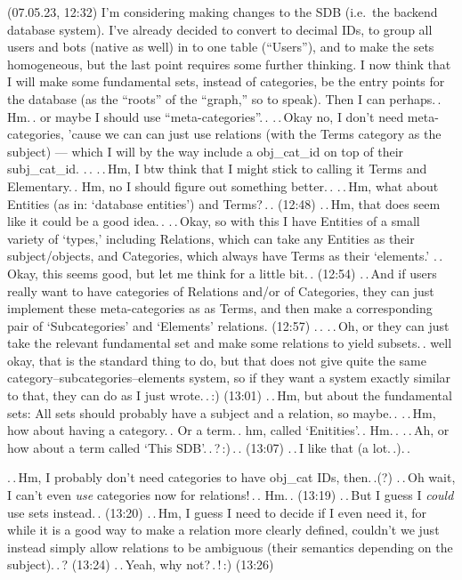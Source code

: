\documentclass{report}
\begin{document}
(07.05.23, 12:32) I'm considering making changes to the SDB (i.e.\ the backend database system). I've already decided to convert to decimal IDs, to group all users and bots (native as well) in to one table (``Users''), and to make the sets homogeneous, but the last point requires some further thinking. I now think that I will make some fundamental sets, instead of categories, be the entry points for the database (as the ``roots'' of the ``graph,'' so to speak). Then I can perhaps.\,. Hm.\,. or maybe I should use ``meta-categories''.\,. %
.\,.\,Okay no, I don't need meta-categories, 'cause we can can just use relations (with the Terms category as the subject) --- which I will by the way include a obj\_cat\_id on top of their subj\_cat\_id. .\,. %
.\,.\,Hm, I btw think that I might stick to calling it Terms and Elementary.\,. Hm, no I should figure out something better.\,. .\,.\,Hm, what about Entities (as in: `database entities') and Terms?\,.\,. (12:48) .\,.\,Hm, that does seem like it could be a good idea.\,. 
.\,.\,Okay, so with this I have Entities of a small variety of `types,' including Relations, which can take any Entities as their subject/objects, and Categories, which always have Terms as their `elements.' .\,.\,Okay, this seems good, but let me think for a little bit.\,. (12:54) .\,.\,And if users really want to have categories of Relations and/or of Categories, they can just implement these meta-categories as as Terms, and then make a corresponding pair of `Subcategories' and `Elements' relations. (12:57) .\,. .\,.\,Oh, or they can just take the relevant fundamental set and make some relations to yield subsets.\,. well okay, that is the standard thing to do, but that does not give quite the same category--subcategories--elements system, so if they want a system exactly similar to that, they can do as I just wrote.\,.\,:) (13:01) .\,.\,Hm, but about the fundamental sets: All sets should probably have a subject and a relation, so maybe.\,. .\,.\,Hm, how about having a category.\,. Or a term.\,. hm, called `Enitities'.\,. Hm.\,. .\,.\,Ah, or how about a term called `This SDB'.\,.\,?\,:)\,.\,. (13:07) .\,.\,I like that (a lot.\,.).\,.

.\,.\,Hm, I probably don't need categories to have obj\_cat IDs, then.\,.(?) .\,.\,Oh wait, I can't even \emph{use} categories now for relations!\,.\,. Hm.\,. (13:19) .\,.\,But I guess I \emph{could} use sets instead.\,. (13:20) .\,.\,Hm, I guess I need to decide if I even need it, for while it is a good way to make a relation more clearly defined, couldn't we just instead simply allow relations to be ambiguous (their semantics depending on the subject).\,.\,? (13:24) .\,.\,Yeah, why not?\,.\,!\,:) (13:26)
\end{document}
